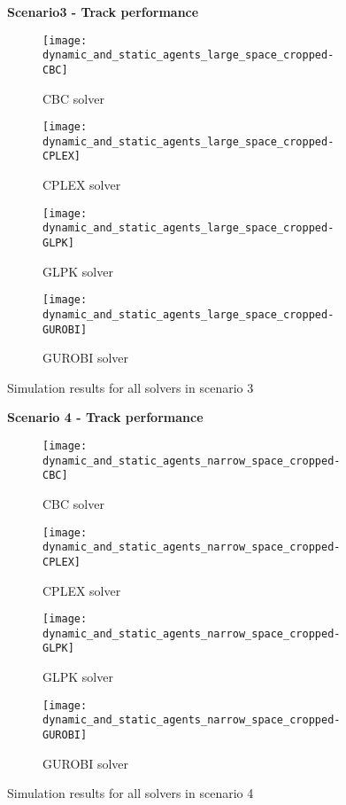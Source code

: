 \begin{figure}[H]
    \centering
    \textbf{Scenario3 - Track performance}\par \medskip
    \begin{subfigure}{0.49\textwidth}
        \centering
        \texttt{[image: dynamic\_and\_static\_agents\_large\_space\_cropped-CBC]}
        \caption{CBC solver}
    \end{subfigure}
    \begin{subfigure}{0.49\textwidth}
        \centering
        \texttt{[image: dynamic\_and\_static\_agents\_large\_space\_cropped-CPLEX]}
        \caption{CPLEX solver}
    \end{subfigure}
    \begin{subfigure}{0.49\textwidth}
        \centering
        \texttt{[image: dynamic\_and\_static\_agents\_large\_space\_cropped-GLPK]}
        \caption{GLPK solver}
    \end{subfigure}
    \begin{subfigure}{0.49\textwidth}
        \centering
        \texttt{[image: dynamic\_and\_static\_agents\_large\_space\_cropped-GUROBI]}
        \caption{GUROBI solver}
    \end{subfigure}
    \caption{Simulation results for all solvers in scenario 3}
	\label{fig:dynamic_and_static_agents_large_space_cropped}
\end{figure}
\begin{figure}[H]
    \centering
    \textbf{Scenario 4 - Track performance}\par \medskip
    \begin{subfigure}{0.49\textwidth}
        \centering
        \texttt{[image: dynamic\_and\_static\_agents\_narrow\_space\_cropped-CBC]}
        \caption{CBC solver}
    \end{subfigure}
    \begin{subfigure}{0.49\textwidth}
        \centering
        \texttt{[image: dynamic\_and\_static\_agents\_narrow\_space\_cropped-CPLEX]}
        \caption{CPLEX solver}
    \end{subfigure}
    \begin{subfigure}{0.49\textwidth}
        \centering
        \texttt{[image: dynamic\_and\_static\_agents\_narrow\_space\_cropped-GLPK]}
        \caption{GLPK solver}
    \end{subfigure}
    \begin{subfigure}{0.49\textwidth}
        \centering
        \texttt{[image: dynamic\_and\_static\_agents\_narrow\_space\_cropped-GUROBI]}
        \caption{GUROBI solver}
    \end{subfigure}
    \caption{Simulation results for all solvers in scenario 4}
	\label{fig:dynamic_and_static_agents_narrow_space_cropped}
\end{figure}

